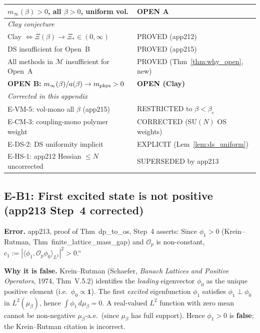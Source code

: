 \begin{center}
\begin{tabular}{p{9.5cm}|l}
$m_\infty(\beta)>0$, all $\beta>0$, uniform vol. & \textbf{OPEN A}\\
\hline
\multicolumn{2}{l}{\textit{Clay conjecture}}\\
Clay $\Leftrightarrow\Xi(\beta)\to\Xi_*\in(0,\infty)$ & PROVED (app212)\\
DS insufficient for Open~B & PROVED (app215)\\
All methods in $\mathcal{M}$ insufficient for Open~A & PROVED (Thm~\ref{thm:why_open}, new)\\
\textbf{OPEN B:} $m_\infty(\beta)/a(\beta)\to m_{\rm phys}>0$ & \textbf{OPEN (Clay)}\\
\hline
\multicolumn{2}{l}{\textit{Corrected in this appendix}}\\
E-VM-5: vol-mono all $\beta$ (app215) & RESTRICTED to $\beta<\beta_c$\\
E-CM-3: coupling-mono polymer weight & CORRECTED (SU$(N)$ OS weights)\\
E-DS-2: DS uniformity implicit & EXPLICIT (Lem~\ref{lem:ds_uniform})\\
E-HS-1: app212 Hessian $\le N$ uncorrected & SUPERSEDED by app213\\
\hline
\end{tabular}
\end{center}


\subsection{E-B1: First excited state is not positive (app213 Step~4 corrected)}
\label{ssec:eb1}

\textbf{Error.}
app213, proof of Thm~dp\_to\_os, Step~4 asserts:
Since $\phi_1>0$ (Krein--Rutman, Thm~finite\_lattice\_mass\_gap)
and $\mathcal{O}_p$ is non-constant,
$c_1:=|\langle\phi_1,\mathcal{O}_p\phi_0\rangle_{L^2}|^2>0$.''

\textbf{Why it is false.}
Krein--Rutman (Schaefer, \textit{Banach Lattices and Positive Operators}, 1974,
Thm~V.5.2) identifies the \emph{leading} eigenvector $\phi_0$ as the unique
positive element (i.e.\ $\phi_0\propto\mathbf{1}$).
The first \emph{excited} eigenfunction $\phi_1$ satisfies $\phi_1\perp\phi_0$
in $L^2(\mu_\beta)$, hence $\int\phi_1\,d\mu_\beta=0$.
A real-valued $L^2$ function with zero mean cannot be non-negative
$\mu_\beta$-a.e.\ (since $\mu_\beta$ has full support).
Hence $\phi_1>0$ is \textbf{false}; the Krein--Rutman citation is incorrect.

